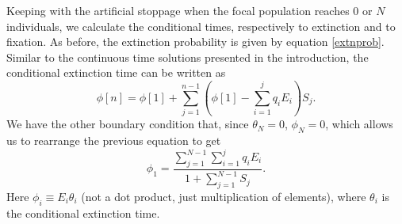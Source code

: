 Keeping with the artificial stoppage when the focal population reaches $0$ or $N$ individuals, we calculate the conditional times, respectively to extinction and to fixation. 
As before, the extinction probability is given by equation \ref{extnprob}. 
Similar to the continuous time solutions presented in the introduction, %
the conditional extinction time can be written as
\begin{equation}
\phi[n] = \phi[1] + \sum_{j=1}^{n-1}\left(\phi[1] - \sum_{i=1}^{j}q_iE_i\right)S_{j}.  
\end{equation}
We have the other boundary condition that, since $\theta_N = 0$, $\phi_N = 0$, which allows us to rearrange the previous equation to get
\begin{equation}
\phi_1 = \frac{\sum_{j=1}^{N-1}\sum_{i=1}^{j}q_iE_i}{1+\sum_{j=1}^{N-1}S_j}. 
\end{equation}
Here $\phi_i \equiv E_i \theta_i$ (not a dot product, just multiplication of elements), where $\theta_i$ is the conditional extinction time. 
